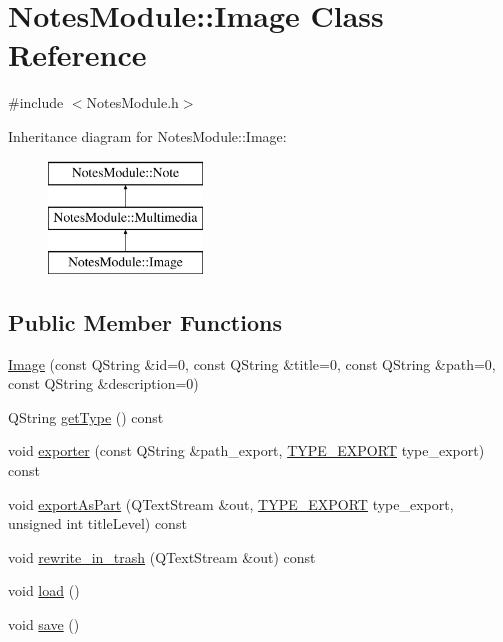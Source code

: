 \hypertarget{class_notes_module_1_1_image}{\section{Notes\-Module\-:\-:Image Class Reference}
\label{class_notes_module_1_1_image}
}


{\ttfamily \#include $<$Notes\-Module.\-h$>$}

Inheritance diagram for Notes\-Module\-:\-:Image\-:\begin{figure}[H]
\begin{center}
\leavevmode
\includegraphics[height=3.000000cm]{class_notes_module_1_1_image}
\end{center}
\end{figure}
\subsection*{Public Member Functions}
\begin{DoxyCompactItemize}
\item 
\hyperlink{class_notes_module_1_1_image_a72e501b3a1622906f96dcb8263616e04}{Image} (const Q\-String \&id=0, const Q\-String \&title=0, const Q\-String \&path=0, const Q\-String \&description=0)
\item 
Q\-String \hyperlink{class_notes_module_1_1_image_a88394eb795b5b731cca0695d9a1fc04c}{get\-Type} () const 
\item 
void \hyperlink{class_notes_module_1_1_image_a398d4ec370565280de2c198d5068d221}{exporter} (const Q\-String \&path\-\_\-export, \hyperlink{_t_y_p_e_s___e_x_p_o_r_t_8h_a25a17d8584d83ab977791df2476e006c}{T\-Y\-P\-E\-\_\-\-E\-X\-P\-O\-R\-T} type\-\_\-export) const 
\item 
void \hyperlink{class_notes_module_1_1_image_a7a5cd3af00d351261e7ebd88d462e1f1}{export\-As\-Part} (Q\-Text\-Stream \&out, \hyperlink{_t_y_p_e_s___e_x_p_o_r_t_8h_a25a17d8584d83ab977791df2476e006c}{T\-Y\-P\-E\-\_\-\-E\-X\-P\-O\-R\-T} type\-\_\-export, unsigned int title\-Level) const 
\item 
void \hyperlink{class_notes_module_1_1_image_abb7c1a2808ec0e39898febbce2a617bb}{rewrite\-\_\-in\-\_\-trash} (Q\-Text\-Stream \&out) const 
\item 
void \hyperlink{class_notes_module_1_1_image_a183b754c660df8caed9088e9915606db}{load} ()
\item 
void \hyperlink{class_notes_module_1_1_image_a643d9f46961e8372b6a573246aad66d1}{save} ()
\end{DoxyCompactItemize}
